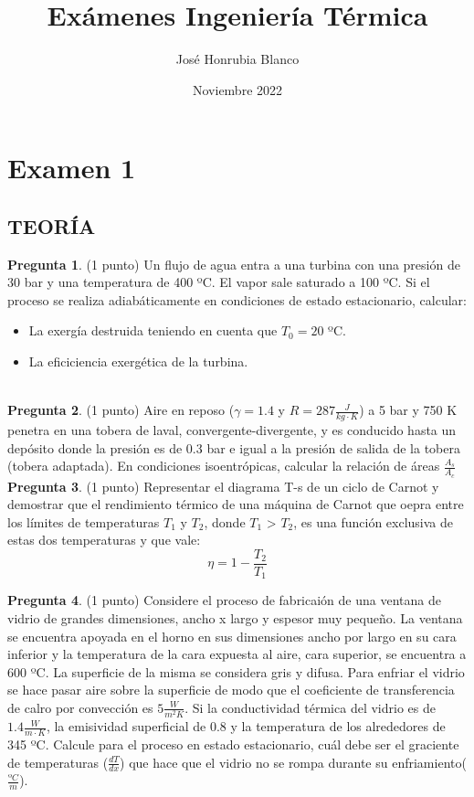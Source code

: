 \documentclass[10pt]{article}
\title{Exámenes Ingeniería Térmica}
\author{José Honrubia Blanco }
\date{Noviembre 2022}
\begin{document}
\section{Examen 1}
\subsection{TEORÍA}
\textbf{Pregunta 1}. (1 punto) Un flujo de agua entra a una turbina con una presión de 30 bar y una temperatura de 400 ºC. El vapor sale saturado a 100 ºC. Si el proceso se realiza adiabáticamente en condiciones de estado estacionario, calcular:
\begin{itemize}
    \item La exergía destruida teniendo en cuenta que $T _{0}=20$ ºC.
    \item La eficiciencia exergética de la turbina.
\end{itemize}

\\ 
\textbf{Pregunta 2}. (1 punto) Aire en reposo ($\gamma = 1.4$ y $R = 287 \frac{J}{kg\cdot K}$) a 5 bar y 750 K penetra en una tobera de laval, convergente-divergente, y es conducido hasta un depósito donde la presión es de 0.3 bar e igual a la presión de salida de la tobera (tobera adaptada). En condiciones isoentrópicas, calcular la relación de áreas $\frac{A _{s}}{A _{c}}$
\\
\textbf{Pregunta 3}. (1 punto) Representar el diagrama T-s de un ciclo de Carnot y demostrar que el rendimiento térmico de una máquina de Carnot que oepra entre los límites de temperaturas $T _{1}$ y $T _{2}$, donde $T _{1}$ > $ T _{2}$, es una función exclusiva de estas dos temperaturas y que vale:
\begin{equation}
    \eta = 1 - \frac{T _{2}}{T _{1}}
  \label{eqn:}
\end{equation}

\textbf{Pregunta 4}. (1 punto) Considere el proceso de fabricaión de una ventana de vidrio de grandes dimensiones, ancho x largo y espesor muy pequeño. La ventana se encuentra apoyada en el horno en sus dimensiones ancho por largo en su cara inferior y la temperatura de la cara expuesta al aire, cara superior, se encuentra a 600 ºC. La superficie de la misma se considera gris y difusa. Para enfriar el vidrio se hace pasar aire sobre la superficie de modo que el coeficiente de transferencia de calro por convección es $5 \frac{W}{m ^{2}K}$. Si la conductividad térmica del vidrio es de $1.4 \frac{W}{m\cdot K}$, la emisividad superficial de 0.8 y la temperatura de los alrededores de 345 ºC. Calcule para el proceso en estado estacionario, cuál debe ser el graciente de temperaturas ($\frac{dT}{dx}$) que hace que el vidrio no se rompa durante su enfriamiento($\frac{ºC}{m}$). 
\\
\end{document}
